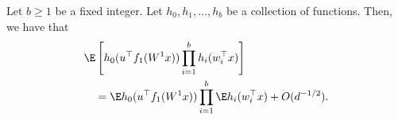 \begin{lemma}
\label{lemma:weak_corr}
Let \(b \geq 1\) be a fixed integer. Let \(h_0, h_1, \ldots, h_b\) be a collection of functions. Then, we have that
    \begin{equation}
        \begin{aligned}
        &\E \left[ h_0(u^{\top} f_1(W^1 x)) \prod_{i=1}^b h_i(w_{i}^{\top} x)\right] \\
        &\quad =\E h_0(u^{\top} f_1(W^1 x)) \prod_{i=1}^b \E h_i(w_{i}^{\top} x) + O(d^{-1/2}).
        \end{aligned}
    \end{equation}
\end{lemma}
